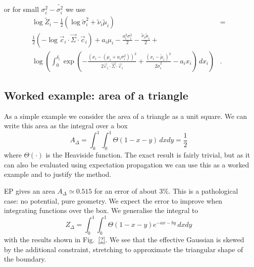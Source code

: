 \documentclass[11pt,twoside]{report}
\begin{document}
or for small $\sigma_i^2 - \tilde{\sigma_i^2}$ we use
\begin{equation}
  \begin{split}
  \log{\tilde{Z}_i}
  - \frac{1}{2}
  \left(
  \log{\tilde{\sigma}_i^2}
  + \tilde{\nu}_i \tilde{\mu}_i
  \right)
  &= \\
  \frac{1}{2} \left( -\log{\vec{c}_i \cdot \vec{\Sigma} \cdot \vec{c}_i} \right)
  + a_i \mu_i
  - \frac{a_i^2 \sigma_i^2}{2}
  - \frac{\tilde{\nu}_i \tilde{\mu}_i}{2}
  + & \\
  \log{\left(
  \int_0^{\delta_i}
  \exp{\left( -\frac{(x_i - (\mu_i + a_i \sigma_i^2))^2}{2 \vec{c}_i \cdot \vec{\Sigma} \cdot \vec{c}_i} +
    \frac{(x_i - \tilde{\mu}_i)^2}{2 \tilde{\sigma}_i^2} -a_i x_i \right)} \, dx_i \right)}&.
  \end{split}
\end{equation}



\subsection{Worked example: area of a triangle}

As a simple example we consider the area of a triangle as a unit square.
We can write this area as the integral over a box
\begin{equation}
  A_\Delta
  = \int_0^1 \int_0^1 \Theta(1 - x - y) \, dx dy
  = \frac{1}{2}
\end{equation}
where $\Theta(\cdot)$ is the Heaviside function.
The exact result is fairly trivial, but as it can also be evaluated using expectation propagation we can use this as a worked example and to justify the method.

EP gives an area $A_\Delta \simeq 0.515$ for an error of about 3\%.
This is a pathological case: no potential, pure geometry.
We expect the error to improve when integrating functions over the box.
We generalise the integral to
\begin{equation}
  Z_\Delta
  = \int_0^1 \int_0^1 \Theta(1 - x - y) e^{-ax - by} \, dx dy
\end{equation}
with the results shown in Fig.\ \ref{?}.
We see that the effective Gaussian is skewed by the additional constraint, stretching to approximate the triangular shape of the boundary.
\end{document}

